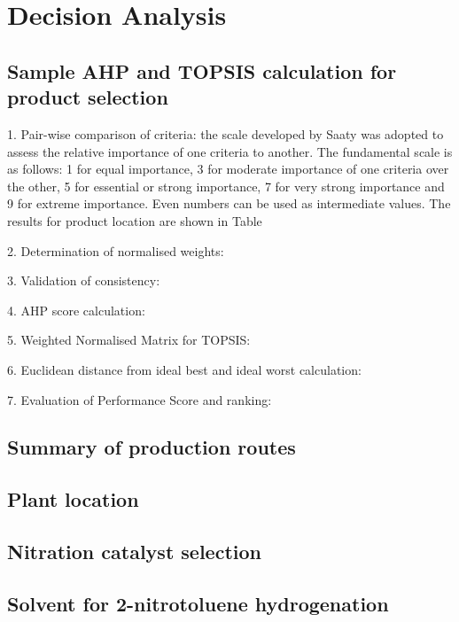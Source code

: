 \section{Decision Analysis}
\label{app:matrix}

\subsection{Sample AHP and TOPSIS calculation for product selection}

1. Pair-wise comparison of criteria: the scale developed by Saaty was adopted to assess the relative importance of one criteria to another. The fundamental scale is as follows: 1 for equal importance, 3 for moderate importance of one criteria over the other, 5 for essential or strong importance, 7 for very strong importance and 9 for extreme importance. Even numbers can be used as intermediate values. The results for product location are shown in Table

2. Determination of normalised weights:

3. Validation of consistency:

4. AHP score calculation:

5. Weighted Normalised Matrix for TOPSIS:

6. Euclidean distance from ideal best and ideal worst calculation:

7. Evaluation of Performance Score and ranking:

\subsection{Summary of production routes}

\subsection{Plant location}

\subsection{Nitration catalyst selection}

\subsection{Solvent for 2-nitrotoluene hydrogenation}

